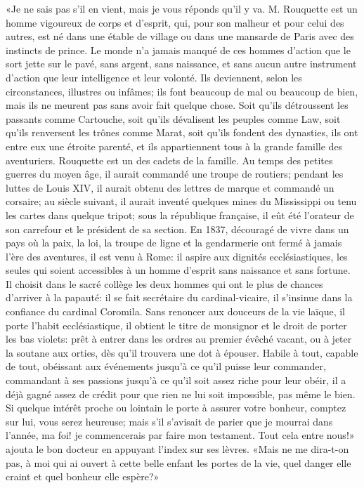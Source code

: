 «Je ne sais pas s'il en vient, mais je vous réponds qu'il y va. M.
Rouquette est un homme vigoureux de corps et d'esprit, qui, pour son
malheur et pour celui des autres, est né dans une étable de village ou
dans une mansarde de Paris avec des instincts de prince. Le monde n'a
jamais manqué de ces hommes d'action que le sort jette sur le pavé, sans
argent, sans naissance, et sans aucun autre instrument d'action que leur
intelligence et leur volonté. Ils deviennent, selon les circonstances,
illustres ou infâmes; ils font beaucoup de mal ou beaucoup de bien, mais
ils ne meurent pas sans avoir fait quelque chose. Soit qu'ils
détroussent les passants comme Cartouche, soit qu'ils dévalisent les
peuples comme Law, soit qu'ils renversent les trônes comme Marat, soit
qu'ils fondent des dynasties, ils ont entre eux une étroite parenté, et
ils appartiennent tous à la grande famille des aventuriers. Rouquette
est un des cadets de la famille. Au temps des petites guerres du moyen
âge, il aurait commandé une troupe de routiers; pendant les luttes de
Louis XIV, il aurait obtenu des lettres de marque et commandé un
corsaire; au siècle suivant, il aurait inventé quelques mines du
Mississippi ou tenu les cartes dans quelque tripot; sous la république
française, il eût été l'orateur de son carrefour et le président de sa
section. En 1837, découragé de vivre dans un pays où la paix, la loi, la
troupe de ligne et la gendarmerie ont fermé à jamais l'ère des
aventures, il est venu à Rome: il aspire aux dignités ecclésiastiques,
les seules qui soient accessibles à un homme d'esprit sans naissance et
sans fortune. Il choisit dans le sacré collège les deux hommes qui ont
le plus de chances d'arriver à la papauté: il se fait secrétaire du
cardinal-vicaire, il s'insinue dans la confiance du cardinal Coromila.
Sans renoncer aux douceurs de la vie laïque, il porte l'habit
ecclésiastique, il obtient le titre de monsignor et le droit de porter
les bas violets: prêt à entrer dans les ordres au premier évêché vacant,
ou à jeter la soutane aux orties, dès qu'il trouvera une dot à épouser.
Habile à tout, capable de tout, obéissant aux événements jusqu'à ce
qu'il puisse leur commander, commandant à ses passions jusqu'à ce qu'il
soit assez riche pour leur obéir, il a déjà gagné assez de crédit pour
que rien ne lui soit impossible, pas même le bien. Si quelque intérêt
proche ou lointain le porte à assurer votre bonheur, comptez sur lui,
vous serez heureuse; mais s'il s'avisait de parier que je mourrai dans
l'année, ma foi! je commencerais par faire mon testament. Tout cela
entre nous!» ajouta le bon docteur en appuyant l'index sur ses lèvres.
«Mais ne me dira-t-on pas, à moi qui ai ouvert à cette belle enfant les
portes de la vie, quel danger elle craint et quel bonheur elle espère?»

